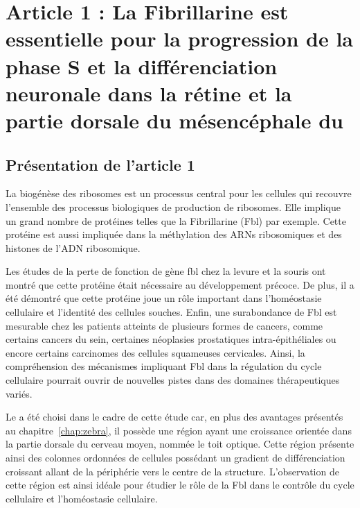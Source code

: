 \documentclass[\main/main.tex]{subfiles}
\begin{document}
\chapter{Article 1 : La
Fibrillarine est essentielle pour la progression de la phase S et la différenciation neuronale dans la rétine et la partie dorsale du mésencéphale du \pz{}
}

\section{Présentation de l'article 1}

\label{sec:bouffard}

%
La biogénèse des ribosomes est un processus central pour les cellules qui recouvre l'ensemble des processus biologiques de production de ribosomes.
%
Elle implique un grand nombre de protéines telles que la Fibrillarine (Fbl) par exemple.
%
Cette protéine est aussi impliquée dans la méthylation des ARNs ribosomiques et des histones de l'ADN ribosomique.

%
Les études de la perte de fonction de gène fbl chez la levure et la souris ont montré que
cette protéine était nécessaire au développement précoce.
%
De plus, il a été démontré que cette protéine joue un rôle important dans l'homéostasie cellulaire et l'identité des cellules souches.
%
Enfin, une surabondance de Fbl est mesurable chez les patients atteints de plusieurs formes de cancers, comme certains cancers du sein, certaines néoplasies prostatiques intra-épithéliales ou encore certains carcinomes des cellules squameuses cervicales.
%
Ainsi, la compréhension des mécanismes impliquant Fbl dans la régulation du cycle cellulaire pourrait ouvrir de nouvelles pistes dans des domaines thérapeutiques variés.

%
Le \pz{} a été choisi dans le cadre de cette étude car,
en plus des avantages présentés au chapitre~\ref{chap:zebra},
il possède une région ayant une croissance orientée dans la partie dorsale du cerveau moyen, nommée le toit optique.
%
Cette région présente ainsi des colonnes ordonnées de cellules possédant
un gradient de différenciation croissant allant de la périphérie vers le centre de la structure.
%
L'observation de cette région est ainsi idéale pour étudier le rôle de la Fbl
dans le contrôle du cycle cellulaire et l'homéostasie cellulaire.
%
\end{document}
